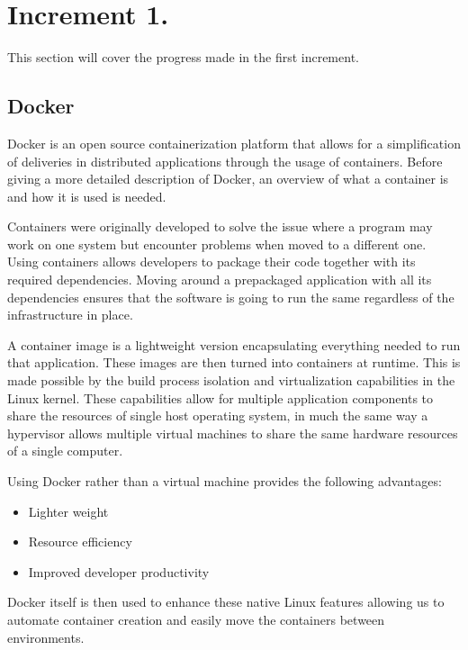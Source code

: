 \section{Increment 1.}
This section will cover the progress made in the first increment. 


\subsection{Docker}
Docker is an open source containerization platform that allows for a simplification of deliveries in distributed applications through the usage of containers. 
Before giving a more detailed description of Docker, an overview of what a container is and how it is used is needed. 


Containers were originally developed to solve the issue where a program may work on one system but encounter problems when moved to a different one. 
Using containers allows developers to package their code together with its required dependencies. 
Moving around a prepackaged application with all its dependencies ensures that the software is going to run the same regardless of the infrastructure in place. 


A container image is a lightweight version encapsulating everything needed to run that application. These images are then turned into containers at runtime. 
This is made possible by the build process isolation and virtualization capabilities in the Linux kernel. 
These capabilities allow for multiple application components to share the resources of single host operating system, 
in much the same way a hypervisor allows multiple virtual machines to share the same hardware resources of a single computer.\cite{Container_Docker}


Using Docker rather than a virtual machine provides the following advantages:

\begin{itemize}
    \item Lighter weight
    \item Resource efficiency
    \item Improved developer productivity
\end{itemize}

Docker itself is then used to enhance these native Linux features allowing us to automate container creation and easily move the containers between environments.\cite{Docker_IBM}

